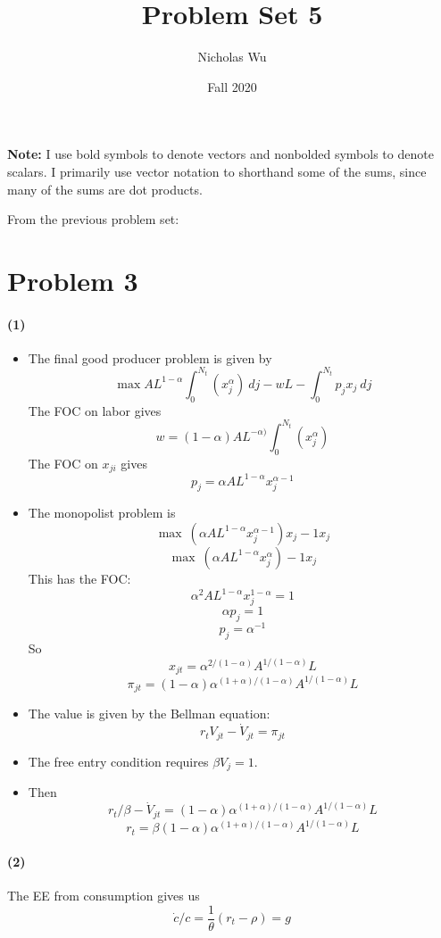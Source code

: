 \documentclass[10pt,letter]{article}
\newcommand{\problem}[1]{\section*{Problem #1}}
\newcommand{\problempart}[1]{\paragraph{#1}}
\begin{document}


\title{Problem Set 5}

\author{Nicholas Wu}

\date{Fall 2020}

\maketitle
\textbf{Note:} I use bold symbols to denote vectors and nonbolded symbols to denote scalars. I primarily use vector notation to shorthand some of the sums, since many of the sums are dot products.

From the previous problem set:
\problem{3}

\problempart{(1)}
\begin{itemize}
  \item The final good producer problem is given by
  \[ \max AL^{1-\alpha} \int_0^{N_t}(x_{j}^\alpha) \ dj - wL - \int_0^{N_t} p_j x_{j} \ dj \]
  The FOC on labor gives
  \[ w = (1-\alpha)AL^{-\alpha) }\int_0^{N_t}(x_{j}^\alpha)  \]
  The FOC on $x_{ji}$ gives
  \[ p_j = \alpha AL^{1-\alpha}x_{j}^{\alpha - 1} \]
  \item The monopolist problem is
  \[ \max \ (\alpha AL^{1-\alpha}x_{j}^{\alpha - 1}) x_{j} - 1 x_{j} \]
  \[ \max \ (\alpha AL^{1-\alpha}x_{j}^{\alpha}) - 1 x_{j} \]
  This has the FOC:
  \[ \alpha^2 AL^{1-\alpha} x_j^{1-\alpha} = 1 \]
  \[ \alpha p_j = 1 \]
  \[ p_j = \alpha^{-1} \]
  So
  \[ x_{jt} = \alpha^{2/(1-\alpha)}A^{1/(1-\alpha)}L \]
  \[ \pi_{jt} = (1-\alpha)\alpha^{(1+\alpha)/(1-\alpha)}A^{1/(1-\alpha)}L \]
  \item The value is given by the Bellman equation:
  \[ r_t V_{jt} - \dot{V}_{jt} = \pi_{jt}  \]
  \item The free entry condition requires $\beta V_j = 1 $.
  \item Then
   \[ r_t/\beta - \dot{V}_{jt} = (1-\alpha)\alpha^{(1+\alpha)/(1-\alpha)}A^{1/(1-\alpha)}L  \]
    \[ r_t = \beta(1-\alpha)\alpha^{(1+\alpha)/(1-\alpha)}A^{1/(1-\alpha)}L  \]
\end{itemize}
\problempart{(2)}
The EE from consumption gives us
\[ \dot{c}/c = \frac{1}{\theta}(r_t-\rho) = g \]
\end{document}
